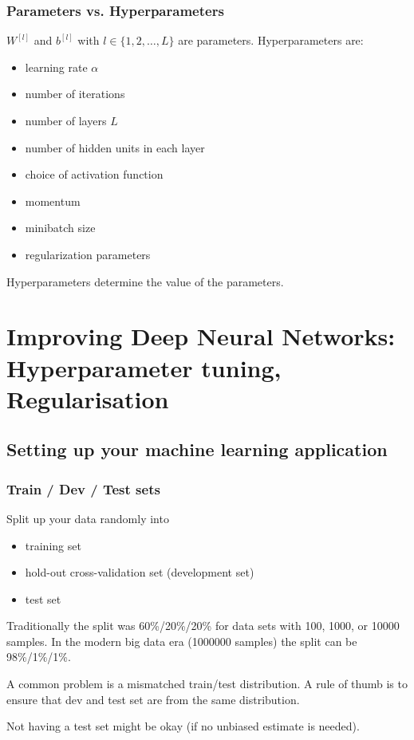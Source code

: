 \documentclass{article}
\begin{document}
\subsubsection{Parameters vs. Hyperparameters}
$W^{[l]}$ and $b^{[l]}$ with $l\in\{1,2,\ldots,L\}$ are parameters.
Hyperparameters are:
\begin{itemize}
  \item learning rate $\alpha$
  \item number of iterations
  \item number of layers $L$
  \item number of hidden units in each layer
  \item choice of activation function
  \item momentum
  \item minibatch size
  \item regularization parameters
\end{itemize}
Hyperparameters determine the value of the parameters.

\section{Improving Deep Neural Networks: Hyperparameter tuning, Regularisation}
\subsection{Setting up your machine learning application}
\subsubsection{Train / Dev / Test sets}
Split up your data randomly into
\begin{itemize}
  \item training set
  \item hold-out cross-validation set (development set)
  \item test set
\end{itemize}
Traditionally the split was 60\%/20\%/20\% for data sets with 100, 1000, or 10000 samples.
In the modern big data era (1000000 samples) the split can be 98\%/1\%/1\%.

A common problem is a mismatched train/test distribution.
A rule of thumb is to ensure that dev and test set are from the same distribution.

Not having a test set might be okay (if no unbiased estimate is needed).
\end{document}
